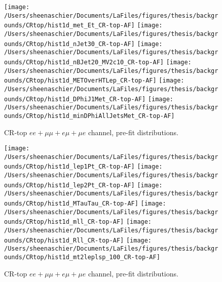 \begin{figure}
    \centering
    \texttt{[image: /Users/sheenaschier/Documents/LaFiles/figures/thesis/backgrounds/CRtop/hist1d\_met\_Et\_CR-top-AF]}
    \texttt{[image: /Users/sheenaschier/Documents/LaFiles/figures/thesis/backgrounds/CRtop/hist1d\_nJet30\_CR-top-AF]}
    \texttt{[image: /Users/sheenaschier/Documents/LaFiles/figures/thesis/backgrounds/CRtop/hist1d\_nBJet20\_MV2c10\_CR-top-AF]}
    \texttt{[image: /Users/sheenaschier/Documents/LaFiles/figures/thesis/backgrounds/CRtop/hist1d\_METOverHTLep\_CR-top-AF]}
     \texttt{[image: /Users/sheenaschier/Documents/LaFiles/figures/thesis/backgrounds/CRtop/hist1d\_DPhiJ1Met\_CR-top-AF]}
     \texttt{[image: /Users/sheenaschier/Documents/LaFiles/figures/thesis/backgrounds/CRtop/hist1d\_minDPhiAllJetsMet\_CR-top-AF]}
        
    \caption{CR-top $ee+\mu\mu +e\mu + \mu e$ channel, pre-fit distributions.}
    \label{fig:CR-top-1}
\end{figure} 

\begin{figure}
    \centering
        \texttt{[image: /Users/sheenaschier/Documents/LaFiles/figures/thesis/backgrounds/CRtop/hist1d\_lep1Pt\_CR-top-AF]}
        \texttt{[image: /Users/sheenaschier/Documents/LaFiles/figures/thesis/backgrounds/CRtop/hist1d\_lep2Pt\_CR-top-AF]}
        \texttt{[image: /Users/sheenaschier/Documents/LaFiles/figures/thesis/backgrounds/CRtop/hist1d\_MTauTau\_CR-top-AF]}
        \texttt{[image: /Users/sheenaschier/Documents/LaFiles/figures/thesis/backgrounds/CRtop/hist1d\_mll\_CR-top-AF]}
        \texttt{[image: /Users/sheenaschier/Documents/LaFiles/figures/thesis/backgrounds/CRtop/hist1d\_Rll\_CR-top-AF]}
        \texttt{[image: /Users/sheenaschier/Documents/LaFiles/figures/thesis/backgrounds/CRtop/hist1d\_mt2leplsp\_100\_CR-top-AF]}
        
    \caption{CR-top $ee+\mu\mu +e\mu + \mu e$ channel, pre-fit distributions.}
    \label{fig:CR-top-2}
\end{figure}
